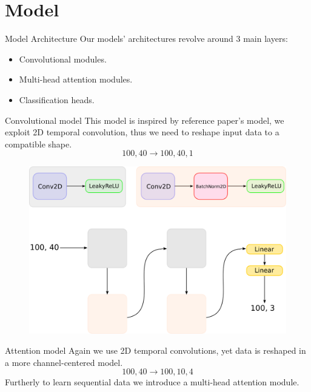 \documentclass{beamer}
\begin{document}
\section{Model}
\begin{frame}{Model Architecture}
    Our models' architectures revolve around 3 main layers:
    \begin{itemize}
        \item Convolutional modules.
        \item Multi-head attention modules.
        \item Classification heads.
    \end{itemize}
\end{frame}

\begin{frame}{Convolutional model}
    This model is inspired by reference paper's model, we exploit 2D temporal convolution, thus we need to reshape input data to a compatible shape.
    \begin{equation*}
        100, 40 \longrightarrow 100, 40, 1
    \end{equation*}
\end{frame}

\begin{frame}
    \begin{figure}
        \centering
        \includegraphics[scale=0.35]{imgs/conv.png}
    \end{figure}
\end{frame}

\begin{frame}{Attention model}
    Again we use 2D temporal convolutions, yet data is reshaped in a more channel-centered model.
    \begin{equation*}
        100, 40 \longrightarrow 100, 10, 4
    \end{equation*}
    Furtherly to learn sequential data we introduce a multi-head attention module.
\end{frame}
\end{document}
